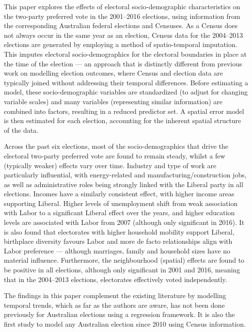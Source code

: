 \documentclass[times, doublespace]{anzsauth}
\begin{document}
This paper explores the effects of electoral socio-demographic characteristics on the two-party preferred vote in the 2001--2016 elections, using information from the corresponding Australian federal elections and Censuses. As a Census does not always occur in the same year as an election, Census data for the 2004--2013 elections are generated by employing a method of spatio-temporal imputation. This imputes electoral socio-demographics for the electoral boundaries in place at the time of the election --- an approach that is distinctly different from previous work on modelling election outcomes, where Census and election data are typically joined without addressing their temporal differences. Before estimating a model, these socio-demographic variables are standardized (to adjust for changing variable scales) and many variables (representing similar information) are combined into factors, resulting in a reduced predictor set. A spatial error model is then estimated for each election, accounting for the inherent spatial structure of the data.

Across the past six elections, most of the socio-demographics that drive the electoral two-party preferred vote are found to remain steady, whilst a few (typically weaker) effects vary over time. Industry and type of work are particularly influential, with energy-related and manufacturing/construction jobs, as well as administrative roles being strongly linked with the Liberal party in all elections. Incomes have a similarly consistent effect, with higher income areas supporting Liberal. Higher levels of unemployment shift from weak association with Labor to a significant Liberal effect over the years, and higher education levels are associated with Labor from 2007 (although only significant in 2016). It is also found that electorates with higher household mobility support Liberal, birthplace diversity favours Labor and more de facto relationships align with Labor preference --- although marriages, family and household sizes have no material influence. Furthermore, the neighbourhood (spatial) effects are found to be positive in all elections, although only significant in 2001 and 2016, meaning that in the 2004--2013 elections, electorates effectively voted independently.

The findings in this paper complement the existing literature by modelling temporal trends, which as far as the authors are aware, has not been done previously for Australian elections using a regression framework. It is also the first study to model any Australian election since 2010 using Census information.
\end{document}
